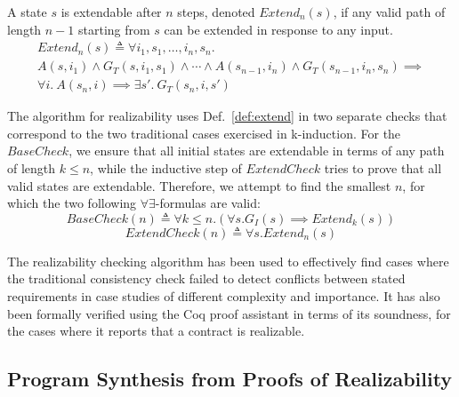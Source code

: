 \begin{definition}
\label{def:extend}
A state $s$ is extendable after $n$ steps, denoted $\mathit{Extend}_{n}(s)$, if
any valid path of length $n-1$ starting from $s$ can be extended in response to
any input.%
%
\begin{multline*}%
\mathit{Extend}_{n}(s) \triangleq \forall i_1, s_1, \ldots, i_n, s_n.\\ A(s, i_1) \land G_T(s, i_1, s_1)
\land \cdots \land
A(s_{n-1}, i_n) \land G_T(s_{n-1}, i_n, s_n)
\implies \\
\forall i.~ A(s_n, i) \implies \exists s'.~ G_T(s_n, i, s')
\end{multline*}
\end{definition}

The algorithm for realizability uses Def.~\ref{def:extend} in two
separate checks that correspond to the two traditional cases exercised in
k-induction. For the $\mathit{BaseCheck}$, we ensure that all initial states are
extendable in terms of any path of length $k\le n$, while the inductive step of
$\mathit{ExtendCheck}$ tries to prove that all valid states are extendable.
Therefore, we attempt to find the smallest $n$, for which the two following 
$\forall\exists$-formulas are valid:%
%
\begin{equation}
\label{eq:sbcheck}
\mathit{BaseCheck}(n) \triangleq \forall k \leq n. (\forall s. G_I(s)
	  	\implies \mathit{Extend}_k(s))
\end{equation}%
%
\begin{equation}
\label{eq:echeck}
\mathit{ExtendCheck}(n) \triangleq \forall s. \mathit{Extend}_n(s)
\end{equation}

The realizability checking algorithm has been used to effectively find cases
where the traditional consistency check failed to detect conflicts between
stated requirements in case studies of different complexity and importance. It
has also been formally verified using the Coq proof assistant in terms of its
soundness, for the cases where it reports that a contract is realizable.

\subsection{Program Synthesis from Proofs of Realizability}

